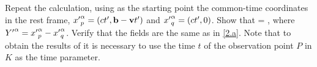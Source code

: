 \newcommand{\xpap}{{x'}^\alp_p}
\newcommand{\xpaq}{{x'}^\alp_q}
\newcommand{\Ya}{Y^\alp}
\newcommand{\Ysa}{Y_\alp}
\newcommand{\Yb}{Y^\bet}
\newcommand{\Ypa}{{Y'}^\alp}

\begin{problem}
	Repeat the calculation, using as the starting point the common-time coordinates in the rest frame, $\xpap = (ct', \vbb - \vv t')$ and $\xpaq = (ct', 0)$.  Show that
	\beqn \label{show2.b}
		\Fab =  \frac{\Ya \Ub - \Yb \Ua}{(- \Ysa \Ya)^{3/2}},
	\eeqn
	where $\Ypa = \xpap - \xpaq$.  Verify that the fields are the same as in \ref{2.a}.  Note that to obtain the results of  it is necessary to use the time $t$ of the observation point $P$ in $K$ as the time parameter.
\end{problem}

\newcommand{\Ypsa}{{Y'}_\alp}
\newcommand{\Ypb}{{Y'}^\bet}
\newcommand{\Upa}{{U'}^\alp}
\newcommand{\Upb}{{U'}^\bet}
\newcommand{\voo}{\mathbf{0}}
\newcommand{\tp}{{t'}}

